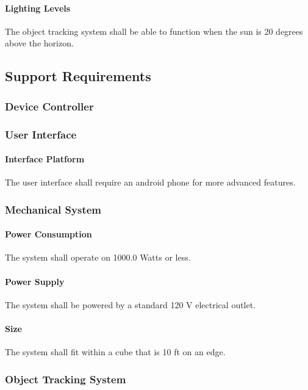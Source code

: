 \paragraph{Lighting Levels}
The object tracking system shall be able to function when the sun is 20 degrees above the horizon.%

\subsection{Support Requirements}

\subsubsection{Device Controller}

\subsubsection{User Interface}

\paragraph{Interface Platform}
The user interface shall require an android phone for more advanced features. 

\subsubsection{Mechanical System}

\paragraph{Power Consumption}
The system shall operate on 1000.0 Watts or less.

\paragraph{Power Supply}
The system shall be powered by a standard 120 V electrical outlet. 

\paragraph{Size}
The system shall fit within a cube that is 10 ft on an edge.

\subsubsection{Object Tracking System}

